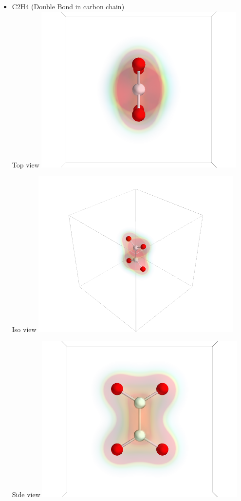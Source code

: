 \documentclass[11pt]{article}
\begin{document}
\begin{itemize}
\item C2H4 (Double Bond in carbon chain)\\
\label{sec-1-6-1-7}%
Top view
\includegraphics[width=.9\linewidth]{./images/C2H4_top.png}

Iso view
\includegraphics[width=.9\linewidth]{./images/C2H4_iso.png}

Side view
\includegraphics[width=.9\linewidth]{./images/C2H4_side.png}


\end{itemize}
\end{document}
